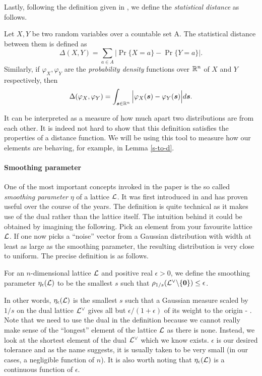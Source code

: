 Lastly, following the definition given in \cite{lbc}, we define the \textit{statistical distance} as follows.
\begin{definition}
        Let $X,Y$ be two random variables over a countable set A. The statistical distance between them is defined as
        \[\Delta(X,Y) = \sum_{a \in A} \Big| \Pr\{X = a\} - \Pr\{Y = a\} \Big|.\]
Similarly, if $\varphi_X, \varphi_Y$ are the \textit{probability density} functions over $\mathbb{R}^n$ of $X$ and $Y$ respectively, then
\[ \Delta(\varphi_X, \varphi_Y) = \int_{\boldsymbol{s} \in \mathbb{R}^n} \Big| \varphi_X(\boldsymbol{s}) - \varphi_Y(\boldsymbol{s}) \Big|d\boldsymbol{s}. \]
\end{definition}
It can be interpreted as a measure of how much apart two distributions are from each other. It is indeed not hard to show that this definition satisfies the properties of a distance function. We will be using this tool to measure how our elements are behaving, for example, in Lemma \ref{s-to-d}.

\paragraph{Smoothing parameter}
One of the most important concepts invoked in the paper is the so called \textit{smoothing parameter} $\eta$ of a lattice $\mathcal{L}$. It was first introduced in \cite{smoothing} and has proven useful over the course of the years. The definition is quite technical as it makes use of the dual rather than the lattice itself. The intuition behind it could be obtained by imagining the following. Pick an element from your favourite lattice $\mathcal{L}$. If one now picks a ``noise'' vector from a Gaussian distribution with width at least as large as the smoothing parameter, the resulting distribution is very close to uniform. The precise definition is as follows.
\begin{definition}\label{smoothing}
        For an $n$-dimensional lattice $\mathcal{L}$ and positive real $\epsilon > 0$, we define the smoothing parameter $\eta_{\epsilon}(\mathcal{L})$ to be the smallest $s$ such that $\rho_{1/s}(\mathcal{L}^{\vee} \backslash \{\boldsymbol{0}\}) \leq \epsilon$.
\end{definition}
In other words, $\eta_{\epsilon}(\mathcal{L})$ is the smallest $s$ such that a Gaussian measure scaled by $1/s$ on the dual lattice $\mathcal{L}^{\vee}$ gives all but $\epsilon/(1+\epsilon)$ of its weight to the origin - \cite{regev}. Note that we need to use the dual in the definition because we cannot really make sense of the ``longest'' element of the lattice $\mathcal{L}$ as there is none. Instead, we look at the shortest element of the dual $\mathcal{L}^{\vee}$ which we know exists. $\epsilon$ is our desired tolerance and as the name suggests, it is usually taken to be very small (in our cases, a negligible function of $n$). It is also worth noting that $\eta_{\epsilon}(\mathcal{L})$ is a continuous function of $\epsilon$. 

